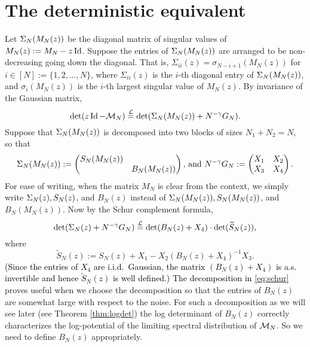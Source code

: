 \documentclass{amsart}
\numberwithin{equation}{section}
\def\corA{}
\def\corAB{}
\def\corABrev{\textcolor{black}}
\begin{document}
\section{The deterministic equivalent}\label{sec:det-equiv}

Let \corA{$\Sigma_N(M_N(z))$} be the diagonal matrix of singular values of \corA{$M_N(z):=M_N-z\operatorname{Id}$}. Suppose the entries of $\Sigma_N(M_N(z))$ are arranged to be non-decreasing going down the diagonal. \corA{That is, $\Sigma_{ii}(z)=\sigma_{N-i+1}(M_N(z))$ for $i \in [N]:=\{1,2,\ldots,N\}$, where $\Sigma_{ii}(z)$ is the $i$-th diagonal entry of $\Sigma_N(M_N(z))$, and $\sigma_i(M_N(z))$ is the $i$-th largest singular value of $M_N(z)$.} By invariance of the Gaussian matrix,
\[
  \det( z\Id - \model_N ) \lawequals \det( \corA{\SVD_N(M_N(z))} + N^{-\gamma}G_N).
\]
 Suppose that \corA{$\Sigma_N(M_N(z))$} is decomposed into two blocks of sizes $N_1+N_2 = N,$ so that
\begin{equation}\label{eq:truncation-dfn}
 \corA{ \SVD_N(M_N(z)) := \begin{pmatrix}
    S_N(M_N(z)) & \\
    & B_N(M_N(z))
  \end{pmatrix},}
  \text{ and }
  N^{-\gamma}G_N := \begin{pmatrix}
    X_1 & X_2 \\
    X_3 & X_4 \\
  \end{pmatrix}.
\end{equation}
For ease of writing, when the matrix $M_N$ is clear from the context, we simply write $\Sigma_N(z), S_N(z)$, and $B_N(z)$ instead of $\Sigma_N(M_N(z)), S_N(M_N(z))$, and $B_N(M_N(z))$.  Now by the Schur complement formula,
\begin{equation}\label{eq:schur}
\det( \Sigma_N(z) + N^{-\gamma}G_N)
\overset{\mathcal{L}}{=}
\det(B_N(z) + X_4) \cdot \det(\widetilde{S}_N(z)),
\end{equation}
where
\begin{equation}\label{eq:tilde-schur}
\widetilde{S}_N(z):=S_N(z) + X_1 \corAB{-} X_2 ( B_N(z) +X_4 )^{-1} X_3.
\end{equation}
\corABrev{(Since the entries of $X_4$ are i.i.d.~Gaussian, the matrix $(B_N(z)+X_4)$ is  a.s.  invertible  and hence $\widetilde S_N(z)$ is well defined.)  The decomposition in \eqref{eq:schur}} proves useful when we choose the decomposition so that the entries of \corA{$B_N(z)$} are somewhat large with respect to the noise. For such a decomposition as we will see later (see Theorem \ref{thm:logdet}) the log determinant of $B_N(z)$ correctly characterizes the log-potential of the limiting spectral distribution of $\mathcal{M}_N$. So we need to define $B_N(z)$ appropriately.
\end{document}
